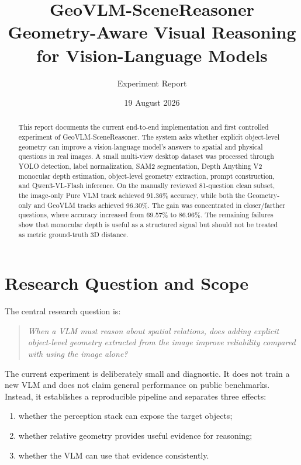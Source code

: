 \documentclass[11pt]{article}
\title{\textbf{GeoVLM-SceneReasoner}\\
\large Geometry-Aware Visual Reasoning for Vision-Language Models}
\author{Experiment Report}
\date{19 August 2026}
\begin{document}
\maketitle

\begin{abstract}
This report documents the current end-to-end implementation and first controlled experiment of GeoVLM-SceneReasoner. The system asks whether explicit object-level geometry can improve a vision-language model's answers to spatial and physical questions in real images. A small multi-view desktop dataset was processed through YOLO detection, label normalization, SAM2 segmentation, Depth Anything V2 monocular depth estimation, object-level geometry extraction, prompt construction, and Qwen3-VL-Flash inference. On the manually reviewed 81-question clean subset, the image-only Pure VLM track achieved 91.36\% accuracy, while both the Geometry-only and GeoVLM tracks achieved 96.30\%. The gain was concentrated in closer/farther questions, where accuracy increased from 69.57\% to 86.96\%. The remaining failures show that monocular depth is useful as a structured signal but should not be treated as metric ground-truth 3D distance.
\end{abstract}

\section{Research Question and Scope}
The central research question is:

\begin{quote}
\emph{When a VLM must reason about spatial relations, does adding explicit object-level geometry extracted from the image improve reliability compared with using the image alone?}
\end{quote}

The current experiment is deliberately small and diagnostic. It does not train a new VLM and does not claim general performance on public benchmarks. Instead, it establishes a reproducible pipeline and separates three effects:

\begin{enumerate}[leftmargin=18pt,itemsep=1pt]
    \item whether the perception stack can expose the target objects;
    \item whether relative geometry provides useful evidence for reasoning;
    \item whether the VLM can use that evidence consistently.
\end{enumerate}
\end{document}
